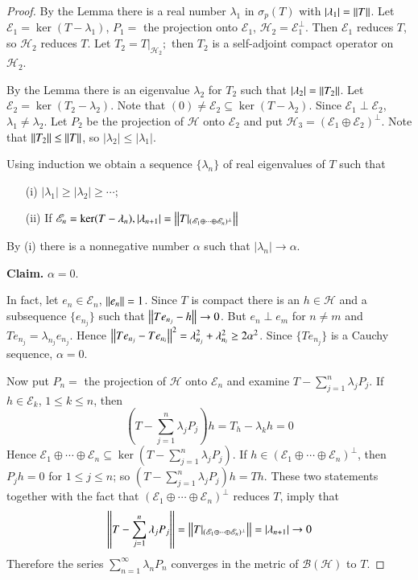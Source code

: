 \begin{proof}
    By the Lemma there is a real number $\lambda_1$ in $\sigma_p(T)$ with $|\lambda_1| = \left|\left| T\right|\right|$. Let $\mathscr{E}_1 = \ker(T-\lambda_1)$, $P_1 = $ the projection onto $\mathscr{E}_1$, $\mathscr{H}_2 = \mathscr{E}_1^{\perp}$. Then $\mathscr{E}_1$ reduces $T$, so $\mathscr{H}_2$ reduces $T$. Let $T_2 = T\vert_{\mathscr{H}_2};$ then $T_2$ is a self-adjoint compact operator on $\mathscr{H}_2$.

    By the Lemma there is an eigenvalue $\lambda_2$ for $T_2$ such that $|\lambda_2| = \left|\left| T_2\right|\right|$. Let $\mathscr{E}_2 = \ker(T_2-\lambda_2)$. Note that $(0) \neq \mathscr{E}_2 \subseteq \ker(T-\lambda_2)$. Since $\mathscr{E}_1\perp\mathscr{E}_2$, $\lambda_1\neq \lambda_2$. Let $P_2$ be the projection of $\mathscr{H}$ onto $\mathscr{E}_2$ and put $\mathscr{H}_3 = (\mathscr{E}_1\oplus \mathscr{E}_2)^{\perp}$. Note that $\left|\left| T_2\right|\right|\leq \left|\left| T\right|\right|$, so $|\lambda_2|\leq |\lambda_1|$.

    Using induction we obtain a sequence $\{\lambda_n\}$ of real eigenvalues of $T$ such that \begin{enumerate}
        \item[(i)] $|\lambda_1| \geq |\lambda_2|\geq \cdots$;
        \item[(ii)] If $\mathscr{E}_n = \ker(T-\lambda_n), |\lambda_{n+1}| = \left|\left| T\vert_{(\mathscr{E}_1\oplus\cdots\oplus\mathscr{E}_n)^{\perp}}\right|\right|$
    \end{enumerate}
    By (i) there is a nonnegative number $\alpha$ such that $|\lambda_n|\rightarrow \alpha$.

    \textbf{Claim.} $\alpha = 0$.

    In fact, let $e_n \in \mathscr{E}_n$, $\left|\left| e_n\right|\right| = 1$. Since $T$ is compact there is an $h \in \mathscr{H}$ and a subsequence $\{e_{n_j}\}$ such that $\left|\left| Te_{n_j}-h\right|\right|\rightarrow 0$. But $e_n\perp e_m$ for $n \neq m$ and $Te_{n_j}=\lambda_{n_j}e_{n_j}$. Hence $\left|\left| Te_{n_j}-Te_{n_i}\right|\right|^2 = \lambda_{n_j}^2+\lambda_{n_i}^2 \geq 2\alpha^2$. Since $\{Te_{n_j}\}$ is a Cauchy sequence, $\alpha = 0$.

    Now put $P_n = $ the projection of $\mathscr{H}$ onto $\mathscr{E}_n$ and examine $T- \sum_{j=1}^n\lambda_jP_j$. If $h \in \mathscr{E}_k$, $1\leq k \leq n$, then $$\left(T-\sum_{j=1}^n\lambda_jP_j\right)h = T_h-\lambda_kh = 0$$
    Hence $\mathscr{E}_1\oplus\cdots\oplus\mathscr{E}_n\subseteq \ker\left(T-\sum_{j=1}^n\lambda_jP_j\right)$. If $h \in (\mathscr{E}_1\oplus\cdots\oplus \mathscr{E}_n)^{\perp}$, then $P_jh = 0$ for $1\leq j \leq n$; so $\left(T-\sum_{j=1}^n\lambda_jP_j\right)h = Th$. These two statements together with the fact that $(\mathscr{E}_1\oplus\cdots\oplus\mathscr{E}_n)^{\perp}$ reduces $T$, imply that $$\left|\left| T-\sum_{j=1}^n\lambda_jP_j\right|\right| = \left|\left| T\vert_{(\mathscr{E}_1\oplus\cdots\oplus\mathscr{E}_n)^{\perp}}\right|\right| = |\lambda_{n+1}|\rightarrow 0$$
    Therefore the series $\sum_{n=1}^{\infty}\lambda_nP_n$ converges in the metric of $\mathscr{B}(\mathscr{H})$ to $T$.
\end{proof}


